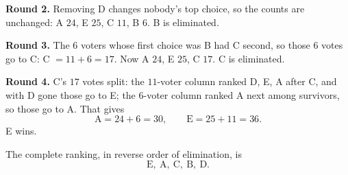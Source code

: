 \documentclass[12pt]{ximera}
\begin{document}
\begin{problem}
\begin{prompt}
\begin{feedback}
\textbf{Round 2.} Removing D changes nobody's top choice, so the counts are unchanged:
A $24$, E $25$, C $11$, B $6$. B is eliminated.

\textbf{Round 3.} The $6$ voters whose first choice was B had C second, so those $6$
votes go to C: C $= 11+6 = 17$. Now A $24$, E $25$, C $17$. C is eliminated.

\textbf{Round 4.} C's $17$ votes split: the $11$-voter column ranked D, E, A after C,
and with D gone those go to E; the $6$-voter column ranked A next among survivors, so
those go to A. That gives
\[ \text{A} = 24+6 = 30, \qquad \text{E} = 25+11 = 36. \]
E wins.

The complete ranking, in reverse order of elimination, is
\[ \text{E},\ \text{A},\ \text{C},\ \text{B},\ \text{D}. \]
\end{feedback}
\end{prompt}
\end{problem}
\end{document}
